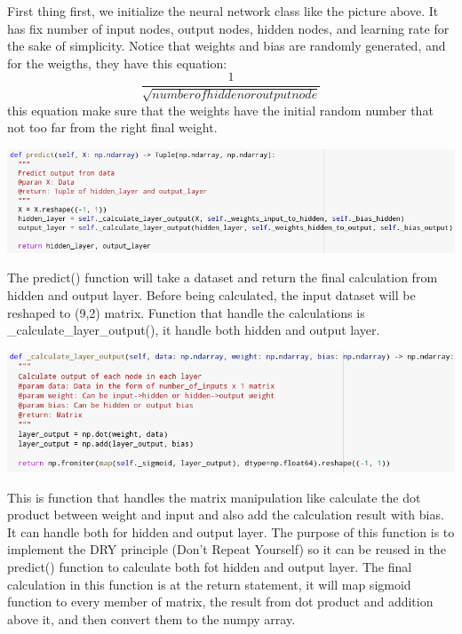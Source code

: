 \documentclass[a4paper, 12pt]{article}
\begin{document}
\begin{multicols}{2}
\justifying
First thing first, we initialize the neural network class like the picture above. It has fix number of input nodes, output nodes, hidden nodes, and learning rate for the sake of simplicity. Notice that weights and bias are randomly generated, and for the weigths, they have this equation:
\begin{equation} 
  \frac{1}{\sqrt{number of hidden or output node}} 
\end{equation}
this equation make sure that the weights have the initial random number that not too far from the right final weight.

\centering
\vspace{0.2cm}
\includegraphics[scale=0.225]{nn_2}
\vspace{0.2cm}

\justifying
The predict() function will take a dataset and return the final calculation from hidden and output layer. Before being calculated, the input dataset will be reshaped to (9,2) matrix. Function that handle the calculations is \_calculate\_layer\_output(), it handle both hidden and output layer. 

\centering
\vspace{0.2cm}
\includegraphics[scale=0.25]{nn_3}
\vspace{0.2cm}

\justifying
This is function that handles the matrix manipulation like calculate the dot product between weight and input and also add the calculation result with bias. It can handle both for hidden and output layer. The purpose of this function is to implement the DRY principle (Don't Repeat Yourself) so it can be reused in the predict() function to calculate both fot hidden and output layer. The final calculation in this function is at the return statement, it will map sigmoid function to every
member of matrix, the result from dot product and addition above it, and then convert them to the numpy array.


\end{multicols}
\end{document}
